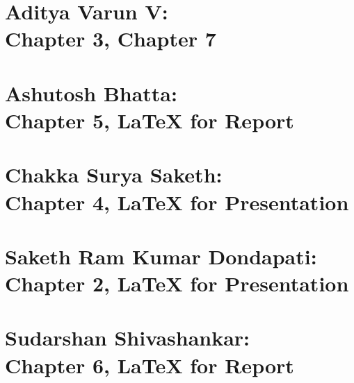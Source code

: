 \documentclass[oneside]{book}
\begin{document}
    \section*{Aditya Varun V: \\Chapter 3, Chapter 7}
    \section*{Ashutosh Bhatta: \\Chapter 5, LaTeX for Report}
    \section*{Chakka Surya Saketh: \\Chapter 4, LaTeX for Presentation}
    \section*{Saketh Ram Kumar Dondapati: \\Chapter 2, LaTeX for Presentation}
    \section*{Sudarshan Shivashankar: \\Chapter 6, LaTeX for Report}
\end{document}

